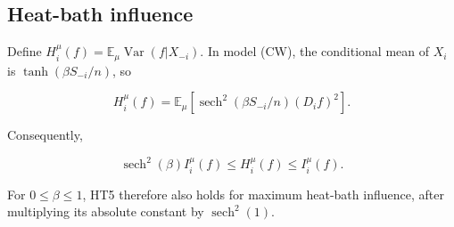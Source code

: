 \subsection{Heat-bath influence}\label{ht:heat-bath-influence}

Define \(H_i^\mu(f)=\mathbb E_\mu \operatorname{Var}(f|X_{-i})\). In model (CW), the conditional mean of \(X_i\) is \(\tanh(\beta S_{-i}/n)\), so

\[
H_i^\mu(f)
=\mathbb E_\mu\left[
\operatorname{sech}^2(\beta S_{-i}/n)(D_i f)^2\right].
\]

Consequently,

\[
\operatorname{sech}^2(\beta) I_i^\mu(f)
\le H_i^\mu(f)\le I_i^\mu(f).
\]

For \(0\le \beta\le 1\), HT5 therefore also holds for maximum heat-bath influence, after multiplying its absolute constant by \(\operatorname{sech}^2(1)\).
